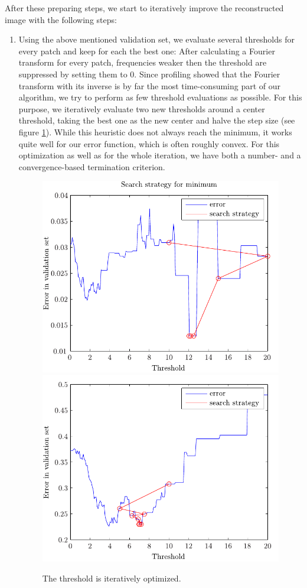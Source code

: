 \documentclass[10pt,conference,compsocconf]{IEEEtran}
\begin{document}
After these preparing steps, we start to iteratively improve the reconstructed image with the following steps:
\begin{enumerate}
\item Using the above mentioned validation set, we evaluate several thresholds for every patch and keep for each the best one: After calculating a Fourier transform for every patch, frequencies weaker then the threshold are suppressed by setting them to 0. Since profiling showed that the Fourier transform with its inverse is by far the most time-consuming part of our algorithm, we try to perform as few threshold evaluations as possible. For this purpose, we iteratively evaluate two new thresholds around a center threshold, taking the best one as the new center and halve the step size (see figure \ref{threshold_optimization}). While this heuristic does not always reach the minimum, it works quite well for our error function, which is often roughly convex. For this optimization as well as for the whole iteration, we have both a number- and a convergence-based termination criterion.

\begin{figure}
\centering
\includegraphics[width=0.8\columnwidth]{../plots/search_strategy_6.pdf}
\includegraphics[width=0.8\columnwidth]{../plots/search_strategy_2.pdf}
\caption{The threshold is iteratively optimized.}
\label{threshold_optimization}
\end{figure}


\end{enumerate}
\end{document}
